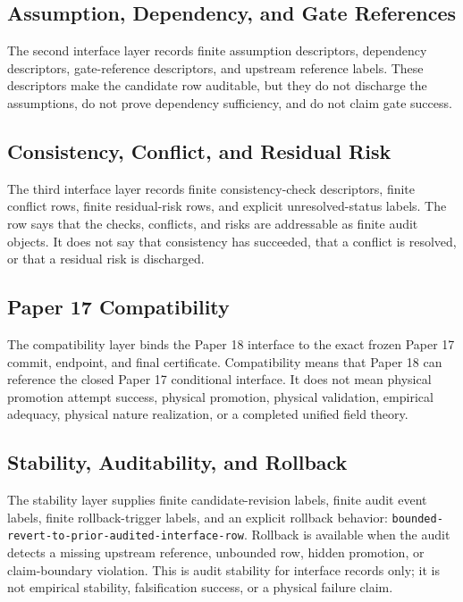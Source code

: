 \documentclass{article}
\begin{document}
\subsection{Assumption, Dependency, and Gate References}

The second interface layer records finite assumption descriptors, dependency
descriptors, gate-reference descriptors, and upstream reference labels.  These
descriptors make the candidate row auditable, but they do not discharge the
assumptions, do not prove dependency sufficiency, and do not claim gate
success.

\subsection{Consistency, Conflict, and Residual Risk}

The third interface layer records finite consistency-check descriptors, finite
conflict rows, finite residual-risk rows, and explicit unresolved-status
labels.  The row says that the checks, conflicts, and risks are addressable as
finite audit objects.  It does not say that consistency has succeeded, that a
conflict is resolved, or that a residual risk is discharged.

\subsection{Paper 17 Compatibility}

The compatibility layer binds the Paper 18 interface to the exact frozen Paper
17 commit, endpoint, and final certificate.  Compatibility means that Paper 18
can reference the closed Paper 17 conditional interface.  It does not mean
physical promotion attempt success, physical promotion, physical validation,
empirical adequacy, physical nature realization, or a completed unified field
theory.

\subsection{Stability, Auditability, and Rollback}

The stability layer supplies finite candidate-revision labels, finite audit
event labels, finite rollback-trigger labels, and an explicit rollback behavior:
\texttt{bounded-revert-to-prior-audited-interface-row}.  Rollback is available
when the audit detects a missing upstream reference, unbounded row, hidden
promotion, or claim-boundary violation.  This is audit stability for interface
records only; it is not empirical stability, falsification success, or a
physical failure claim.
\end{document}

